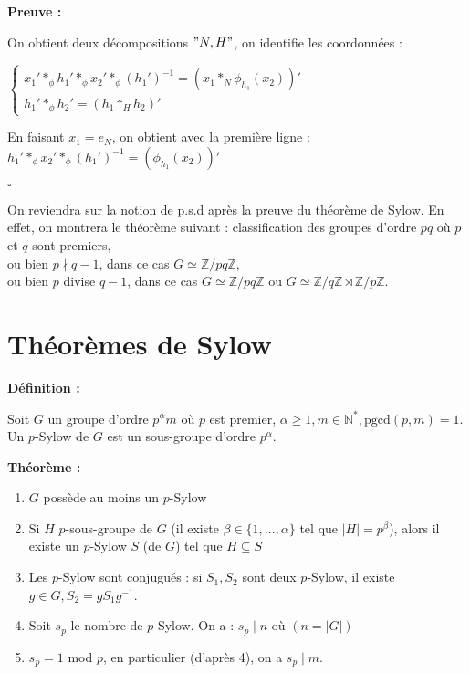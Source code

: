 \documentclass{report}
\renewenvironment{leftbar}{%
  \def\FrameCommand{\vrule width 0.4pt \hspace{10pt}}%
  \MakeFramed {\advance\hsize-\width \FrameRestore}}%
 {\endMakeFramed}%
\newenvironment{definition}[1][]{
    \begin{tcolorbox}[colframe= white]
    \textbf{Définition :} 
    #1 \par
    }
    {\end{tcolorbox}}
\newenvironment{preuve}{\vspace*{0.5cm}
    \begin{leftbar}
    \noindent\textbf{Preuve :}\par}{
    \begin{flushright}
    $\square$
    \end{flushright}
    \end{leftbar}
}
\newenvironment{theoreme}[1][]{
    \begin{tcolorbox}[]
    \textbf{Théorème :} #1  \par} 
    {\end{tcolorbox}}
\newcommand{\N}{\mathbb{N}}
\newcommand{\Z}{\mathbb{Z}}
\begin{document}
\begin{preuve}
    On obtient deux décompositions $"N,H"$, on identifie les coordonnées : 

    $\begin{cases}
        x_1' \ast_{\phi} h_1' \ast_{\phi} x_2' \ast_{\phi} (h_1 ')^{-1} = (x_1 \ast_N \phi_{h_1}(x_2))'\\
        h_1' \ast_{\phi} h_2' = (h_1 \ast_H h_2)'
    \end{cases}$

    En faisant $x_1 = e_N$, on obtient avec la première ligne :
    $h_1' \ast_{\phi} x_2' \ast_{\phi} (h_1')^{-1} = (\phi_{h_1}(x_2))'$
\end{preuve}

On reviendra sur la notion de p.s.d après la preuve du théorème de Sylow. En effet, on montrera le théorème suivant : classification des groupes d'ordre $pq$ où $p$ et $q$ sont premiers,\\
ou bien $p \nmid q-1$, dans ce cas $G \simeq \Z / pq\Z$,\\
ou bien $p$ divise $q-1$, dans ce cas $G \simeq \Z / pq\Z$ ou $G \simeq \Z / q\Z \rtimes \Z / p\Z$.




\chapter{Théorèmes de Sylow}

\begin{definition}
    Soit $G$ un groupe d'ordre $p^{\alpha}m$ où $p$ est premier, $\alpha \geq 1, m \in \N^*, \text{pgcd}(p,m) = 1$.\\
    Un $p$-Sylow de $G$ est un sous-groupe d'ordre $p^{\alpha}$.
\end{definition}

\begin{theoreme}
    \begin{enumerate}
        \item $G$ possède au moins un $p$-Sylow
        \item Si $H$ $p$-sous-groupe de $G$ (il existe $\beta \in \{1,..., \alpha\}$ tel que $|H| = p^{\beta}$), alors il existe un $p$-Sylow $S$ (de $G$) tel que $H \subseteq S$
        \item Les $p$-Sylow sont conjugués : si $S_1, S_2$ sont deux $p$-Sylow, il existe $g \in G, S_2 = gS_1 g^{-1}$.
        \item Soit $s_p$ le nombre de $p$-Sylow. On a : $s_p \mid n$ où $(n = |G|)$
        \item $s_p = 1$ mod $p$, en particulier (d'après 4), on a $s_p \mid m$.
    \end{enumerate}
\end{theoreme}
\end{document}
